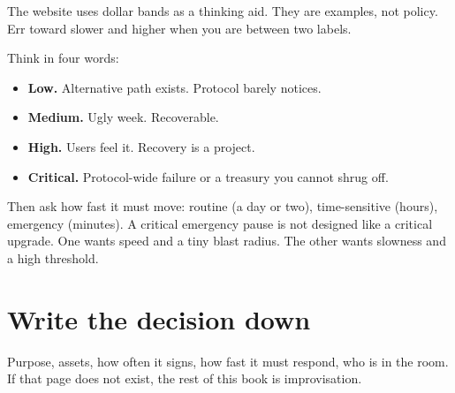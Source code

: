 The website uses dollar bands as a thinking aid.
They are examples, not policy. Err toward slower
and higher when you are between two labels.

Think in four words:

\begin{itemize}
  \item \textbf{Low.} Alternative path exists.
  Protocol barely notices.
  \item \textbf{Medium.} Ugly week. Recoverable.
  \item \textbf{High.} Users feel it. Recovery is
  a project.
  \item \textbf{Critical.} Protocol-wide failure
  or a treasury you cannot shrug off.
\end{itemize}

Then ask how fast it must move: routine (a day or
two), time-sensitive (hours), emergency (minutes).
A critical emergency pause is not designed like a
critical upgrade. One wants speed and a tiny
blast radius. The other wants slowness and a high
threshold.

\section{Write the decision down}

Purpose, assets, how often it signs, how fast it
must respond, who is in the room. If that page
does not exist, the rest of this book is
improvisation.
